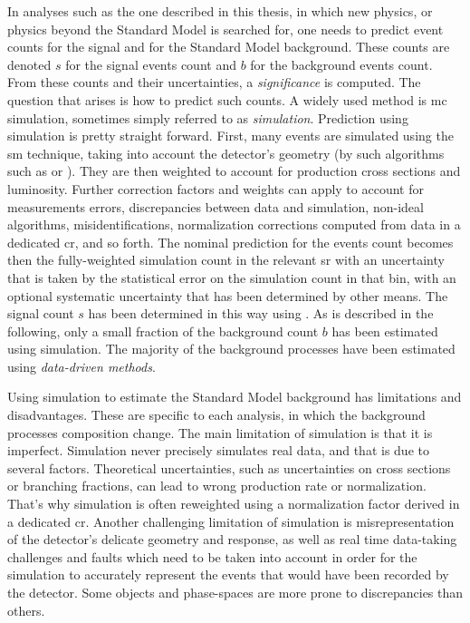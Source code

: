 In analyses such as the one described in this thesis, in which new physics, or physics beyond the Standard Model is searched for, one needs to predict event counts for the signal and for the Standard Model background. These counts are denoted $s$ for the signal events count and $b$ for the background events count. From these counts and their uncertainties, a \emph{significance} is computed. The question that arises is how to predict such counts. A widely used method is \gls{mc} simulation, sometimes simply referred to as \emph{simulation}. Prediction using simulation is pretty straight forward. First, many events are simulated using the \gls{sm} technique, taking into account the detector's geometry (by such algorithms such as \FASTSIM or \FULLSIM). They are then weighted to account for production cross sections and luminosity. Further correction factors and weights can apply to account for measurements errors, discrepancies between data and simulation, non-ideal algorithms, misidentifications, normalization corrections computed from data in a dedicated \gls{cr}, and so forth. The nominal prediction for the events count becomes then the fully-weighted simulation count in the relevant \gls{sr} with an uncertainty that is taken by the statistical error on the simulation count in that bin, with an optional systematic uncertainty that has been determined by other means. The signal count $s$ has been determined in this way using \FASTSIM. As is described in the following, only a small fraction of the background count $b$ has been estimated using simulation. The majority of the background processes have been estimated using \emph{data-driven methods}.

Using simulation to estimate the Standard Model background has limitations and disadvantages. These are specific to each analysis, in which the background processes composition change. The main limitation of simulation is that it is imperfect. Simulation never precisely simulates real data, and that is due to several factors. Theoretical uncertainties, such as uncertainties on cross sections or branching fractions, can lead to wrong production rate or normalization. That's why simulation is often reweighted using a normalization factor derived in a dedicated \gls{cr}. Another challenging limitation of simulation is misrepresentation of the detector's delicate geometry and response, as well as real time data-taking challenges and faults which need to be taken into account in order for the simulation to accurately represent the events that would have been recorded by the detector. Some objects and phase-spaces are more prone to discrepancies than others.

